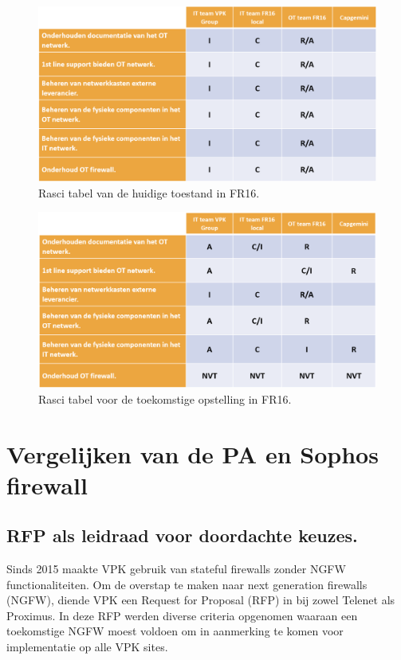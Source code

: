 \begin{figure}[H]
    \centering
    \includegraphics[width=1\textwidth]{fotos/Rasci_AS-IS.png}
    \caption[Foto Rasci AS-IS]{\label{fig:grail}Rasci tabel van de huidige toestand in FR16.}
\end{figure} 

\begin{figure}[H]
    \centering
    \includegraphics[width=1\textwidth]{fotos/Rasci_TO-BE.png}
    \caption[Foto Rasci TO-BE]{\label{fig:grail}Rasci tabel voor de toekomstige opstelling in FR16.}
\end{figure} 


\chapter{Vergelijken van de PA en Sophos firewall}


\section{RFP als leidraad voor doordachte keuzes.}
Sinds 2015 maakte VPK gebruik van stateful firewalls zonder NGFW functionaliteiten. Om de overstap te maken naar next generation firewalls (NGFW), diende VPK een Request for Proposal (RFP) in bij zowel Telenet als Proximus. In deze RFP werden diverse criteria opgenomen waaraan een toekomstige NGFW moest voldoen om in aanmerking te komen voor implementatie op alle VPK sites.

